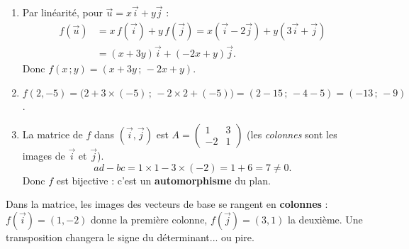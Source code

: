 \documentclass[11pt]{article}
\begin{document}
\begin{corrige}
\begin{enumerate}
\item Par linéarité, pour $\vec{u}=x\vec{i}+y\vec{j}$ :
\begin{align*}
f(\vec{u}) &= x\,f(\vec{i})+y\,f(\vec{j}) = x(\vec{i}-2\vec{j})+y(3\vec{i}+\vec{j})\\
&= (x+3y)\vec{i}+(-2x+y)\vec{j}.
\end{align*}
Donc $f(x\,;y)=(x+3y\,;\,-2x+y)$.
\item $f(2,-5)=\bigl(2+3\times(-5)\,;\,-2\times 2+(-5)\bigr)=(2-15\,;\,-4-5)=(-13\,;\,-9)$.
\item La matrice de $f$ dans $(\vec{i},\vec{j})$ est $A=\begin{pmatrix} 1 & 3 \\ -2 & 1 \end{pmatrix}$ (les \emph{colonnes} sont les images de $\vec{i}$ et $\vec{j}$).
\[ ad-bc = 1\times 1 - 3\times(-2) = 1+6 = 7 \neq 0. \]
Donc $f$ est bijective : c'est un \textbf{automorphisme} du plan.
\end{enumerate}
\end{corrige}

\begin{attention}
Dans la matrice, les images des vecteurs de base se rangent en \textbf{colonnes} : $f(\vec{i})=(1,-2)$ donne la première colonne, $f(\vec{j})=(3,1)$ la deuxième. Une transposition changera le signe du déterminant... ou pire.
\end{attention}
\end{document}
